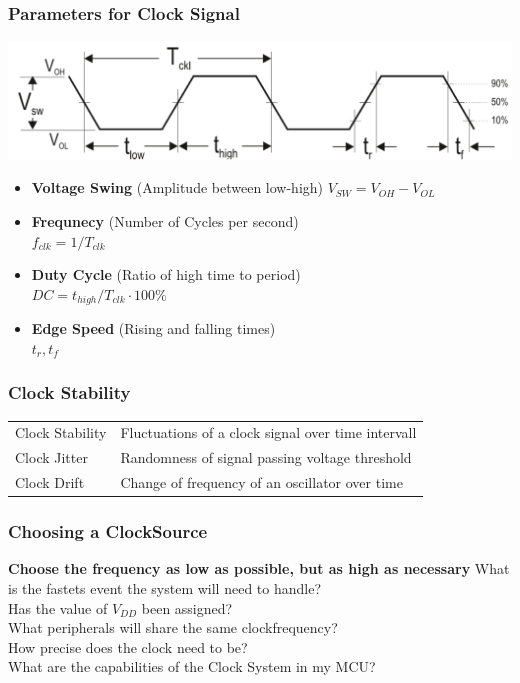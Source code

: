\subsubsection{Parameters for Clock Signal }
\begin{minipage}{\linewidth}
    \centering
    \includegraphics[width=0.7\linewidth]{images/clock_parameters.png}
\end{minipage}
\begin{minipage}{\linewidth}
    \begin{multicols}{2}
	\begin{itemize}
		\item \textbf{Voltage Swing} (Amplitude between low-high) $V_{SW}=V_{OH}-V_{OL}$
		\item \textbf{Frequnecy} (Number of Cycles per second) \\$f_{clk}=1/T_{clk}$
		\item \textbf{Duty Cycle} (Ratio of high time to period)\\ $DC=t_{high}/T_{clk} \cdot 100 \%$
		\item \textbf{Edge Speed} (Rising and falling times)\\$t_r, t_f$
	\end{itemize}
\end{multicols}
\end{minipage}

\subsubsection{Clock Stability }
\begin{tabular}{ll}
	Clock Stability & Fluctuations of a clock signal over time intervall\\
	Clock Jitter & Randomness of signal passing voltage threshold\\
    Clock Drift & Change of frequency of an oscillator over time\\
\end{tabular}

\clearpage

\vspace{-0.5cm}
\subsubsection{Choosing a ClockSource }
\textbf{\danger Choose the frequency as low as possible, but as high as necessary \danger }\newline
What is the fastets event the system will need to handle?\\
Has the value of $ V_{DD} $ been assigned?\\
What peripherals will share the same clockfrequency?\\
How precise does the clock need to be?\\
What are the capabilities of the Clock System in my MCU?

